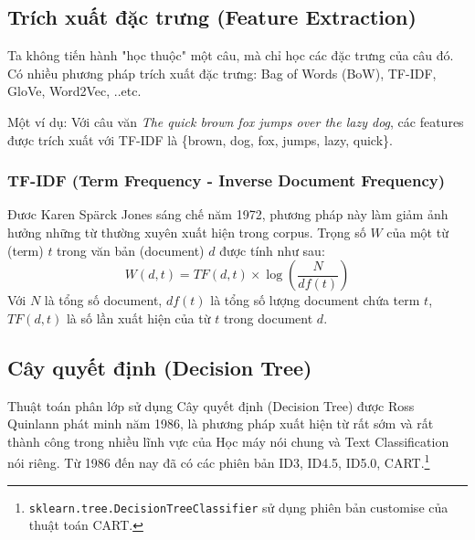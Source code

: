 \documentclass[12pt]{article}
\begin{document}
\subsection{Trích xuất đặc trưng (Feature Extraction)}
Ta không tiến hành "học thuộc" một câu, mà chỉ học các đặc trưng của câu đó. Có nhiều phương pháp trích xuất đặc trưng: Bag of Words (BoW), TF-IDF, GloVe, Word2Vec, ..etc.

Một ví dụ: Với câu văn \textit{The quick brown fox jumps over the lazy dog}, các features được trích xuất với TF-IDF là \{brown, dog, fox, jumps, lazy, quick\}.
\subsubsection{TF-IDF (Term Frequency - Inverse Document Frequency)}
Đươc Karen Spärck Jones sáng chế năm 1972\cite{Jones72astatistical}, phương pháp này làm giảm ảnh hưởng những từ thường xuyên xuất hiện trong corpus. Trọng số $W$ của một từ (term) $t$ trong văn bản (document) $d$ được tính như sau:
$$
W(d, t) = TF(d, t) \times \log\left(\frac{N}{df(t)}\right)
$$
Với $N$ là tổng số document, $df(t)$ là tổng số lượng document chứa term $t$, $TF(d, t)$ là số lần xuất hiện của từ $t$ trong document $d$.

\subsection{Cây quyết định (Decision Tree)}
Thuật toán phân lớp sử dụng Cây quyết định (Decision Tree) được Ross Quinlann phát minh năm 1986\cite{DBLP:journals/ml/Quinlan86}, là phương pháp xuất hiện từ rất sớm và rất thành công trong nhiều lĩnh vực của Học máy nói chung và Text Classification nói riêng. Từ 1986 đến nay đã có các phiên bản ID3, ID4.5, ID5.0, CART.\footnote{\texttt{sklearn.tree.DecisionTreeClassifier} sử dụng phiên bản customise của thuật toán CART.\cite{scikit-learn}}
\end{document}
